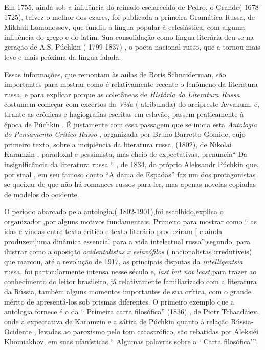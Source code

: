 Em 1755, ainda sob a influência do reinado esclarecido de Pedro, o
Grande( 1678-1725), talvez o melhor dos czares, foi publicada a primeira
Gramática Russa, de Mikhail Lomonossov, que fundiu a língua popular à
eclesiástica, com alguma influência do grego e do latim. Sua
consolidação como língua literária deu-se na geração de A.S. Púchkin (
1799-1837) , o poeta nacional russo, que a tornou mais leve e mais
próxima da língua falada.

Essas informações, que remontam às aulas de Boris Schnaiderman, são
importantes para mostrar como é relativamente recente o fenômeno da
literatura russa, e para explicar porque as coletâneas de \emph{História
da Literatura Russa} costumem começar com excertos da \emph{Vida} (
atribulada) do arcipreste Avvakum, e, tirante as crônicas e hagiografias
escritas em eslavão, passem praticamente à época de Púchkin . É
justamente com essa passagem que se inicia esta \emph{Antologia do
Pensamento Crítico Russo} , organizada por Bruno Barretto Gomide, cujo
primeiro texto, sobre a incipiência da literatura russa, (1802), de
Nikolai Karamzin , paradoxal e pessimista, mas cheio de expectativas,
prenuncia`` Da insignificância da literatura russa `` , de 1834, do
próprio Aleksandr Púchkin que, por sinal , em seu famoso conto ``A dama
de Espadas'' faz um dos protagonistas se queixar de que não há romances
russos para ler, mas apenas novelas copiadas de modelos do ocidente.

O período abarcado pela antologia,( 1802-1901),foi escolhido,explica o
organizador ,por alguns motivos fundamentais. Primeiro para mostrar como
`` as idas e vindas entre texto crítico e texto literário produziram {[}
e ainda produzem{]}uma dinâmica essencial para a vida intelectual
russa'';segundo, para ilustrar como a oposição \emph{ocidentalistas x
eslavófilos} ( nacionalistas irredutíveis) que marcou, até a revolução
de 1917, as principais disputas da \emph{intelligentsia} russa, foi
particularmente intensa nesse século e, \emph{last but not least,}para
trazer ao conhecimento do leitor brasileiro, já relativamente
familiarizado com a literatura da Rússia, também alguns momentos
importantes de sua crítica, com o grande mérito de apresentá-los sob
prismas diferentes. O primeiro exemplo que a antologia fornece é o da ``
Primeira carta filosófica'' (1836) , de Piotr Tchaadáiev, onde a
expectativa de Karamzin e a sátira de Púchkin quanto à relação
Rússia-Ocidente , levadas ao paroxismo pelo tom catastrófico, são
rebatidas por Aleksiéi Khomiakhov, em suas ufanísticas `` Algumas
palavras sobre a ` Carta filosófica'''.

